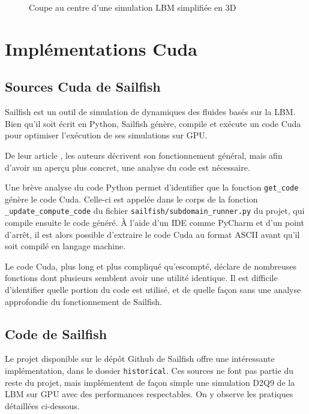 \begin{figure}[h]
{		\label{fig:lbm_simple_3d_460}
	}
	\caption{Coupe au centre d'une simulation \ac{LBM} simplifiée en 3D}
	\label{fig:lbm_simple_3d}
\end{figure}

\section{Implémentations Cuda}
\subsection{Sources Cuda de Sailfish}
Sailfish est un outil de simulation de dynamiques des fluides basés sur la \ac{LBM}. Bien qu'il soit écrit en Python, Sailfish génère, compile et exécute un code Cuda pour optimiser l'exécution de ses simulations sur \acs{GPU}.

De leur article \cite{januszewski_sailfish:_2014}, les auteurs décrivent son fonctionnement général, mais afin d'avoir un aperçu plus concret, une analyse du code est nécessaire. 

Une brève analyse du code Python permet d'identifier que la fonction \texttt{get\_code} génère le code Cuda. Celle-ci est appelée dans le corps de la fonction \texttt{\_update\_compute\_code} du fichier \texttt{sailfish/subdomain\_runner.py} du projet, qui compile ensuite le code généré. À l'aide d'un \acs{IDE} comme PyCharm et d'un point d'arrêt, il est alors possible d'extraire le code Cuda au format \acs{ASCII} avant qu'il soit compilé en langage machine.

Le code Cuda, plus long et plus compliqué qu'escompté, déclare de nombreuses fonctions dont plusieurs semblent avoir une utilité identique. Il est difficile d'identifier quelle portion du code est utilisé, et de quelle façon sans une analyse approfondie du fonctionnement de Sailfish.

\subsection{Code  de Sailfish}
Le projet disponible sur le dépôt Github de Sailfish offre une intéressante implémentation, dans le dossier \texttt{historical}. Ces sources ne font pas partie du reste du projet, mais implémentent de façon simple une simulation D2Q9 de la \acs{LBM} sur \acs{GPU} avec des performances respectables. On y observe les pratiques détaillées ci-dessous.

